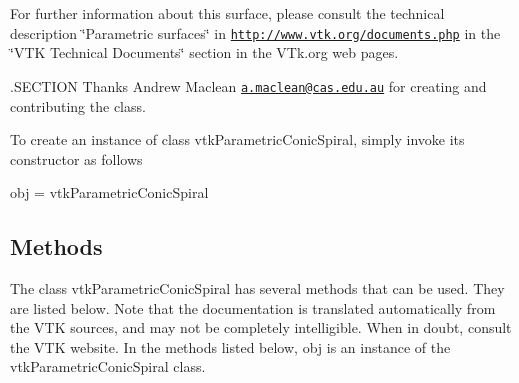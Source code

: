 For further information about this surface, please consult the technical description \char`\"{}\-Parametric surfaces\char`\"{} in \href{http://www.vtk.org/documents.php}{\tt http\-://www.\-vtk.\-org/documents.\-php} in the \char`\"{}\-V\-T\-K Technical Documents\char`\"{} section in the V\-Tk.\-org web pages.

.S\-E\-C\-T\-I\-O\-N Thanks Andrew Maclean \href{mailto:a.maclean@cas.edu.au}{\tt a.\-maclean@cas.\-edu.\-au} for creating and contributing the class.

To create an instance of class vtk\-Parametric\-Conic\-Spiral, simply invoke its constructor as follows \begin{DoxyVerb}  obj = vtkParametricConicSpiral
\end{DoxyVerb}
 \hypertarget{vtkwidgets_vtkxyplotwidget_Methods}{}\subsection{Methods}\label{vtkwidgets_vtkxyplotwidget_Methods}
The class vtk\-Parametric\-Conic\-Spiral has several methods that can be used. They are listed below. Note that the documentation is translated automatically from the V\-T\-K sources, and may not be completely intelligible. When in doubt, consult the V\-T\-K website. In the methods listed below, {\ttfamily obj} is an instance of the vtk\-Parametric\-Conic\-Spiral class. 
